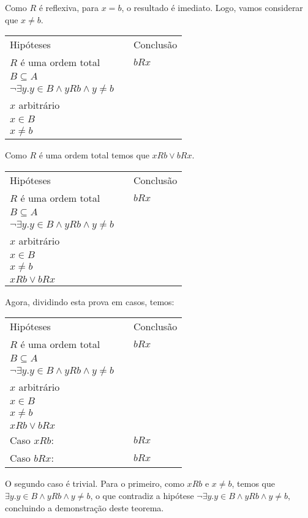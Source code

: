 Como $R$ é reflexiva, para $x = b$, o resultado é imediato. Logo,
vamos considerar que $x \neq b$.
\begin{flushleft}
\begin{tabular}{lcl}
 Hip\'oteses & \hspace{3cm} & Conclusão\\
$R$ é uma ordem total & & $b R x$\\
$B \subseteq A$ & & \\
$\neg \exists y. y\in B \land yRb \land y \neq b$\\
$x$ arbitrário & &\\
$x \in B$ & & \\
$x \neq b$ & & \\
 \end{tabular}
\end{flushleft}
Como $R$ é uma ordem total temos que $xRb \lor bRx$.
\begin{flushleft}
\begin{tabular}{lcl}
 Hip\'oteses & \hspace{3cm} & Conclusão\\
$R$ é uma ordem total & & $b R x$\\
$B \subseteq A$ & & \\
$\neg \exists y. y\in B \land yRb \land y \neq b$\\
$x$ arbitrário & &\\
$x \in B$ & & \\
$x \neq b$ & & \\
$xRb \lor bRx$ & &\\
 \end{tabular}
\end{flushleft}
Agora, dividindo esta prova em casos, temos:
\begin{flushleft}
\begin{tabular}{lcl}
 Hip\'oteses & \hspace{3cm} & Conclusão\\
$R$ é uma ordem total & & $b R x$\\
$B \subseteq A$ & & \\
$\neg \exists y. y\in B \land yRb \land y \neq b$\\
$x$ arbitrário & &\\
$x \in B$ & & \\
$x \neq b$ & & \\
$xRb \lor bRx$ & &\\
Caso $xRb$:   & & $bRx$ \\
Caso $bRx$:  & & $bRx$
 \end{tabular}
\end{flushleft}
O segundo caso é trivial. Para o primeiro, como $xRb$ e $x \neq b$,
temos que $\exists y. y\in B \land y R b \land y \neq b$, o que
contradiz a hipótese $\neg \exists y. y\in B \land yRb \land y \neq
b$, concluindo a demonstração deste teorema.

